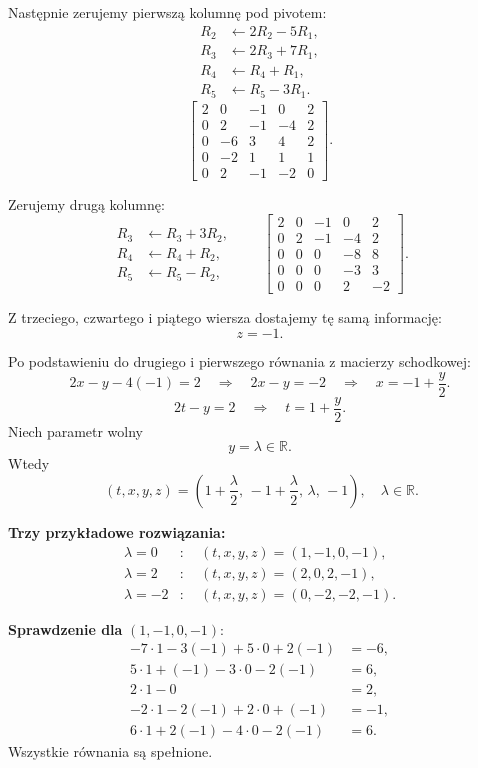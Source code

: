 \documentclass[12pt,a4paper]{article}
\begin{document}
Następnie zerujemy pierwszą kolumnę pod pivotem:
\[
\begin{aligned}
R_2&\leftarrow 2R_2-5R_1,\\
R_3&\leftarrow 2R_3+7R_1,\\
R_4&\leftarrow R_4+R_1,\\
R_5&\leftarrow R_5-3R_1.
\end{aligned}
\]
\[
\left[
\begin{array}{rrrr|r}
2&0&-1&0&2\\
0&2&-1&-4&2\\
0&-6&3&4&2\\
0&-2&1&1&1\\
0&2&-1&-2&0
\end{array}
\right].
\]

Zerujemy drugą kolumnę:
\[
\begin{aligned}
R_3&\leftarrow R_3+3R_2,\\
R_4&\leftarrow R_4+R_2,\\
R_5&\leftarrow R_5-R_2,
\end{aligned}
\qquad
\left[
\begin{array}{rrrr|r}
2&0&-1&0&2\\
0&2&-1&-4&2\\
0&0&0&-8&8\\
0&0&0&-3&3\\
0&0&0&2&-2
\end{array}
\right].
\]

Z trzeciego, czwartego i piątego wiersza dostajemy tę samą informację:
\[
z=-1.
\]

Po podstawieniu do drugiego i pierwszego równania z macierzy schodkowej:
\[
2x-y-4(-1)=2\quad\Longrightarrow\quad 2x-y=-2\quad\Longrightarrow\quad x=-1+\frac y2.
\]
\[
2t-y=2\quad\Longrightarrow\quad t=1+\frac y2.
\]
Niech parametr wolny
\[
y=\lambda\in\mathbb R.
\]
Wtedy
\[
\boxed{\
(t,x,y,z)=\left(1+\frac\lambda2,\,-1+\frac\lambda2,\,\lambda,\,-1\right),\quad \lambda\in\mathbb R.
}
\]

\textbf{Trzy przykładowe rozwiązania:}
\begin{align*}
\lambda=0&:\quad (t,x,y,z)=(1,-1,0,-1),\\
\lambda=2&:\quad (t,x,y,z)=(2,0,2,-1),\\
\lambda=-2&:\quad (t,x,y,z)=(0,-2,-2,-1).
\end{align*}

\textbf{Sprawdzenie dla }$(1,-1,0,-1)$:
\begin{align*}
-7\cdot1-3(-1)+5\cdot0+2(-1)&=-6,\\
5\cdot1+(-1)-3\cdot0-2(-1)&=6,\\
2\cdot1-0&=2,\\
-2\cdot1-2(-1)+2\cdot0+(-1)&=-1,\\
6\cdot1+2(-1)-4\cdot0-2(-1)&=6.
\end{align*}
Wszystkie równania są spełnione.
\end{document}
